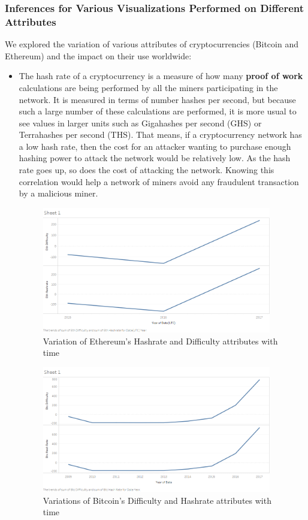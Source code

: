 \documentclass{article}
\begin{document}
\subsubsection{Inferences for Various Visualizations Performed on Different Attributes}
We explored the variation of various attributes of cryptocurrencies (Bitcoin and Ethereum) and the impact on their use worldwide:
\begin{itemize}

\item The hash rate of a cryptocurrency is a measure of how many \textbf{proof of work} calculations are being performed by all the miners participating in the network. It is measured in terms of number hashes per second, but because such a large number of these calculations are performed, it is more usual to see values in larger units such as Gigahashes per second (GHS) or Terrahashes per second (THS).
That means, if a cryptocurrency network has a low hash rate, then the cost for an attacker wanting to purchase enough hashing power to attack the network would be relatively low. As the hash rate goes up, so does the cost of attacking the network. 
Knowing this correlation would help a network of miners avoid any fraudulent transaction by a malicious miner.

\begin{figure}[h]
    \centering
    \includegraphics[width=10cm]{eth_hashrate_difficulty.png}
    \caption{Variation of Ethereum's Hashrate and Difficulty attributes with time}
    \label{fig:my_label}
\end{figure}

\newpage
\begin{figure}[h]
    \centering
    \includegraphics[width=10cm]{btc_difficulty_hashrate.png}
    \caption{Variations of Bitcoin's Difficulty and Hashrate attributes with time}
    \label{fig:my_label}
\end{figure}


\end{itemize}
\end{document}
